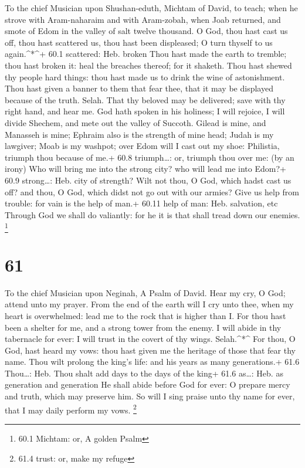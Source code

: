 To the chief Musician upon Shushan-eduth, Michtam of David, to teach;
when he strove with Aram-naharaim and with Aram-zobah, when Joab
returned, and smote of Edom in the valley of salt twelve thousand.
 O God, thou hast cast us off, thou hast scattered us, thou
hast been displeased; O turn thyself to us again.\^{}*\^{}+ 60.1
scattered: Heb. broken  Thou hast made the earth to tremble;
thou hast broken it: heal the breaches thereof; for it shaketh.
 Thou hast shewed thy people hard things: thou hast made us
to drink the wine of astonishment.  Thou hast given a banner
to them that fear thee, that it may be displayed because of the truth.
Selah.  That thy beloved may be delivered; save with thy
right hand, and hear me.  God hath spoken in his holiness; I
will rejoice, I will divide Shechem, and mete out the valley of Succoth.
 Gilead is mine, and Manasseh is mine; Ephraim also is the
strength of mine head; Judah is my lawgiver;  Moab is my
washpot; over Edom will I cast out my shoe: Philistia, triumph thou
because of me.+ 60.8 triumph\ldots: or, triumph thou over me: (by an
irony)  Who will bring me into the strong city? who will
lead me into Edom?+ 60.9 strong\ldots: Heb. city of strength?
 Wilt not thou, O God, which hadst cast us off? and thou, O
God, which didst not go out with our armies?  Give us help
from trouble: for vain is the help of man.+ 60.11 help of man: Heb.
salvation, etc  Through God we shall do valiantly: for he
it is that shall tread down our enemies. \footnote{60.1 Michtam: or, A
  golden Psalm}

\hypertarget{section-60}{%
\section{61}\label{section-60}}

To the chief Musician upon Neginah, A Psalm of David.  Hear
my cry, O God; attend unto my prayer.  From the end of the
earth will I cry unto thee, when my heart is overwhelmed: lead me to the
rock that is higher than I.  For thou hast been a shelter
for me, and a strong tower from the enemy.  I will abide in
thy tabernacle for ever: I will trust in the covert of thy wings.
Selah.\^{}*\^{}  For thou, O God, hast heard my vows: thou
hast given me the heritage of those that fear thy name. 
Thou wilt prolong the king's life: and his years as many generations.+
61.6 Thou\ldots: Heb. Thou shalt add days to the days of the king+ 61.6
as\ldots: Heb. as generation and generation  He shall abide
before God for ever: O prepare mercy and truth, which may preserve him.
 So will I sing praise unto thy name for ever, that I may
daily perform my vows. \footnote{61.4 trust: or, make my refuge}

